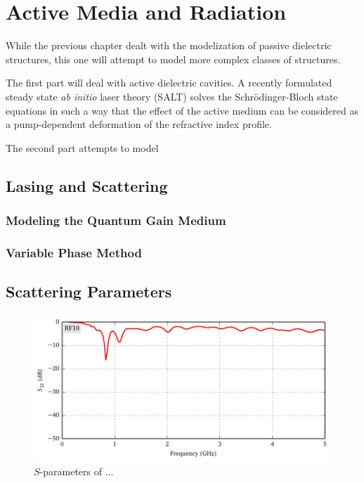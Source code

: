 \chapter{Active Media and Radiation}
While the previous chapter dealt with the modelization
of passive dielectric structures, this one will attempt
to model more complex classes of structures. 

The first part will
deal with active dielectric cavities. A recently formulated
steady state \textit{ab initio} laser theory (SALT) solves the 
Schrödinger-Bloch state equations in such a way that the effect of
the active medium can be considered as a pump-dependent
deformation of the refractive index profile.  

The second part attempts to model 

\section{Lasing and Scattering}

\subsection{Modeling the Quantum Gain Medium}

\subsection{Variable Phase Method}

\section{Scattering Parameters}

\begin{figure}
 \centering
 \includegraphics{figs/active/RF10-sParameters.pdf}
 \caption{$S$-parameters of ...}
\end{figure}

